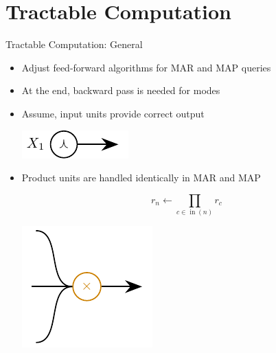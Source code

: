 \documentclass[aspectratio=169]{beamer}
\DeclareMathOperator{\nodein}{in}
\begin{document}
\section{Tractable Computation}
  \begin{frame}{Tractable Computation: General}
    \begin{itemize}
      \item<+-> Adjust feed-forward algorithms for MAR and MAP queries
      \item<+-> At the end, backward pass is needed for modes
      \item<+-> Assume, input units provide correct output \\[1em]
      \begin{center}
        \includegraphics{figures/input-unit.pdf}
      \end{center}
      \item<+-> Product units are handled identically in MAR and MAP \\[1em]
      \begin{minipage}[c]{0.4\textwidth}
        \begin{mybox}
          \[
            r_n \longleftarrow \prod_{c\in\nodein(n)} r_c
          \]
        \end{mybox}
      \end{minipage}
      \hfill
      \begin{minipage}[c]{0.45\textwidth}
        \centering
        \includegraphics{figures/product-unit.pdf}
      \end{minipage}
    \end{itemize}
  \end{frame}
\end{document}
